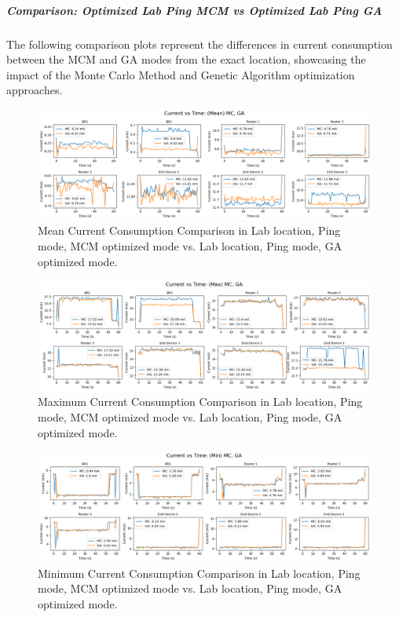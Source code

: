 \subparagraph{Comparison: Optimized Lab Ping MCM vs Optimized Lab Ping GA}
The following comparison plots represent the differences in current consumption between the MCM and GA modes from the exact location, showcasing the impact of the Monte Carlo Method and Genetic Algorithm optimization approaches.

\begin{figure}[H]
  \centering
  \includegraphics[width=1\textwidth]{images/research_results/current_consumption_analysis/optimized/lab/ping/ga/comparison/mean_comparison_lab_ping_mc_vs_lab_ping_ga.png}
    \caption{Mean Current Consumption Comparison in Lab location, Ping mode, MCM optimized mode vs. Lab location, Ping mode, GA optimized mode.}
    \label{fig:mean_comparison_lab_ping_mc_vs_lab_ping_ga}
\end{figure}

\begin{figure}[H]
  \centering
  \includegraphics[width=1\textwidth]{images/research_results/current_consumption_analysis/optimized/lab/ping/ga/comparison/max_comparison_lab_ping_mc_vs_lab_ping_ga.png}
    \caption{Maximum Current Consumption Comparison in Lab location, Ping mode, MCM optimized mode vs. Lab location, Ping mode, GA optimized mode.}
    \label{fig:max_comparison_lab_ping_mc_vs_lab_ping_ga}
\end{figure}

\begin{figure}[H]
  \centering
  \includegraphics[width=1\textwidth]{images/research_results/current_consumption_analysis/optimized/lab/ping/ga/comparison/min_comparison_lab_ping_mc_vs_lab_ping_ga.png}
    \caption{Minimum Current Consumption Comparison in Lab location, Ping mode, MCM optimized mode vs. Lab location, Ping mode, GA optimized mode.}
    \label{fig:min_comparison_lab_ping_mc_vs_lab_ping_ga}
\end{figure}

